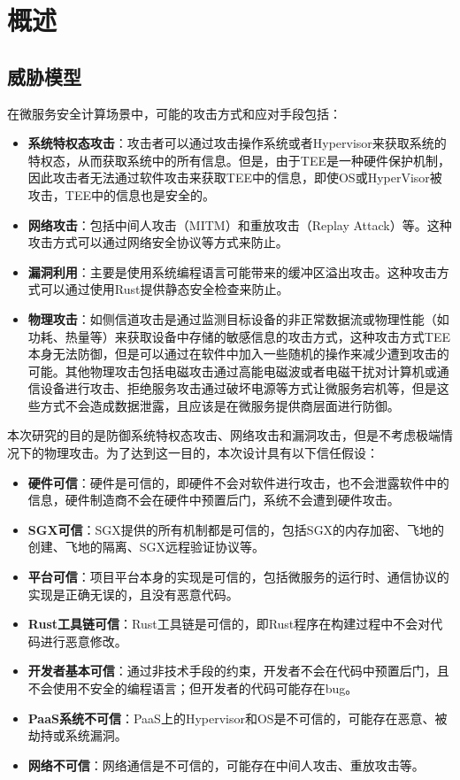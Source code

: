 \section{概述}\label{sec:overview}

\subsection{威胁模型}

在微服务安全计算场景中，可能的攻击方式和应对手段包括：

\begin{itemize}
    \item \textbf{系统特权态攻击}：攻击者可以通过攻击操作系统或者Hypervisor来获取系统的特权态，从而获取系统中的所有信息。但是，由于TEE是一种硬件保护机制，因此攻击者无法通过软件攻击来获取TEE中的信息，即使OS或HyperVisor被攻击，TEE中的信息也是安全的。
    \item \textbf{网络攻击}：包括中间人攻击（MITM）和重放攻击（Replay Attack）等。这种攻击方式可以通过网络安全协议等方式来防止。
    \item \textbf{漏洞利用}：主要是使用系统编程语言可能带来的缓冲区溢出攻击。这种攻击方式可以通过使用Rust提供静态安全检查来防止。
    \item \textbf{物理攻击}：如侧信道攻击是通过监测目标设备的非正常数据流或物理性能（如功耗、热量等）来获取设备中存储的敏感信息的攻击方式，这种攻击方式TEE本身无法防御，但是可以通过在软件中加入一些随机的操作来减少遭到攻击的可能。其他物理攻击包括电磁攻击通过高能电磁波或者电磁干扰对计算机或通信设备进行攻击、拒绝服务攻击通过破坏电源等方式让微服务宕机等，但是这些方式不会造成数据泄露，且应该是在微服务提供商层面进行防御。
\end{itemize}

本次研究的目的是防御系统特权态攻击、网络攻击和漏洞攻击，但是不考虑极端情况下的物理攻击。为了达到这一目的，本次设计具有以下信任假设：

\begin{itemize}
    \item \textbf{硬件可信}：硬件是可信的，即硬件不会对软件进行攻击，也不会泄露软件中的信息，硬件制造商不会在硬件中预置后门，系统不会遭到硬件攻击。
    \item \textbf{SGX可信}：SGX提供的所有机制都是可信的，包括SGX的内存加密、飞地的创建、飞地的隔离、SGX远程验证协议等。
    \item \textbf{平台可信}：项目平台本身的实现是可信的，包括微服务的运行时、通信协议的实现是正确无误的，且没有恶意代码。
    \item \textbf{Rust工具链可信}：Rust工具链是可信的，即Rust程序在构建过程中不会对代码进行恶意修改。
    \item \textbf{开发者基本可信}：通过非技术手段的约束，开发者不会在代码中预置后门，且不会使用不安全的编程语言；但开发者的代码可能存在bug。
    \item \textbf{PaaS系统不可信}：PaaS上的Hypervisor和OS是不可信的，可能存在恶意、被劫持或系统漏洞。
    \item \textbf{网络不可信}：网络通信是不可信的，可能存在中间人攻击、重放攻击等。
\end{itemize}


